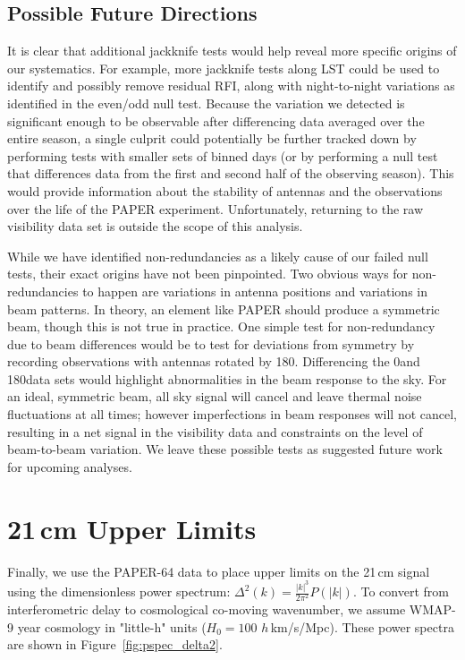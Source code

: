 \subsection{Possible Future Directions}

It is clear that additional jackknife tests would help reveal more specific origins of our systematics. For example, more jackknife tests along LST could be used to identify and possibly remove residual RFI, along with night-to-night variations as identified in the even/odd null test. Because the variation we detected is significant enough to be observable after differencing data averaged over the entire season, a single culprit could potentially be further tracked down by performing tests with smaller sets of binned days (or by performing a null test that differences data from the first and second half of the observing season). This would provide information about the stability of antennas and the observations over the life of the PAPER experiment. Unfortunately, returning to the raw visibility data set is outside the scope of this analysis.

While we have identified non-redundancies as a likely cause of our failed null tests, their exact origins have not been pinpointed. Two obvious ways for non-redundancies to happen are variations in antenna positions and variations in beam patterns. In theory, an element like PAPER should produce a symmetric beam, though this is not true in practice. One simple test for non-redundancy due to beam differences would be to test for deviations from symmetry by recording observations with antennas rotated by 180\arcdeg. Differencing the 0\arcdeg and 180\arcdeg data sets would highlight abnormalities in the beam response to the sky. For an ideal, symmetric beam, all sky signal will cancel and leave thermal noise fluctuations at all times; however imperfections in beam responses will not cancel, resulting in a net signal in the visibility data and constraints on the level of beam-to-beam variation. We leave these possible tests as suggested future work for upcoming analyses.

\section{21\,cm Upper Limits}
\label{sec:upperlims}

Finally, we use the PAPER-64 data to place upper limits on the 21\,cm signal using the
dimensionless power spectrum: $\Delta^{2}(k)= \frac{|k|^{3}}{2\pi^{2}}P(|k|)$. To convert from
interferometric delay to cosmological co-moving wavenumber, we assume WMAP-9 year cosmology in "little-h" units ($ H_{0}=100 $ $ h\, $km/s/Mpc). These power spectra are shown in Figure~\ref{fig:pspec_delta2}.

